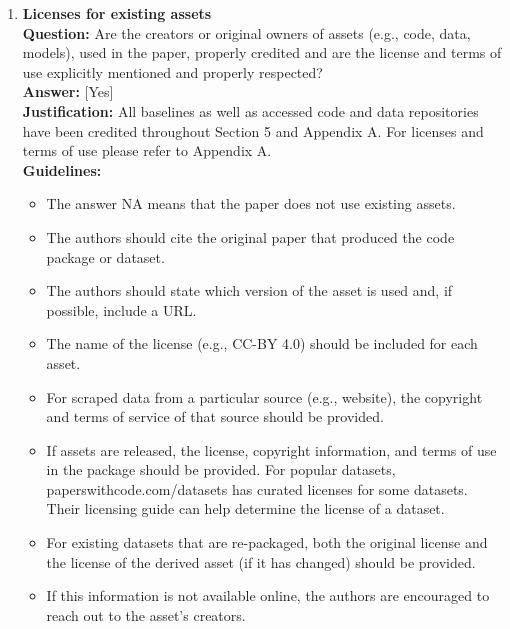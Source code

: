 \begin{enumerate}
\item \textbf{Licenses for existing assets}\\
\textbf{Question:} Are the creators or original owners of assets (e.g., code, data, models), used in the paper, properly credited and are the license and terms of use explicitly mentioned and properly respected?\\
\textbf{Answer:} [Yes]\\
\textbf{Justification:} All baselines as well as accessed code and data repositories have been credited throughout Section 5 and Appendix A. For licenses and terms of use please refer to Appendix A.\\
\textbf{Guidelines:}
\begin{itemize}
\item The answer NA means that the paper does not use existing assets.
\item The authors should cite the original paper that produced the code package or dataset.
\item The authors should state which version of the asset is used and, if possible, include a URL.
\item The name of the license (e.g., CC-BY 4.0) should be included for each asset.
\item For scraped data from a particular source (e.g., website), the copyright and terms of service of that source should be provided.
\item If assets are released, the license, copyright information, and terms of use in the package should be provided. For popular datasets, paperswithcode.com/datasets has curated licenses for some datasets. Their licensing guide can help determine the license of a dataset.
\item For existing datasets that are re-packaged, both the original license and the license of the derived asset (if it has changed) should be provided.
\item If this information is not available online, the authors are encouraged to reach out to the asset's creators.
\end{itemize}


\end{enumerate}
